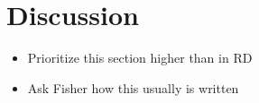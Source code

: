 \chapter{Discussion}

\begin{itemize}
	\item Prioritize this section higher than in RD
	\item Ask Fisher how this usually is written
\end{itemize}